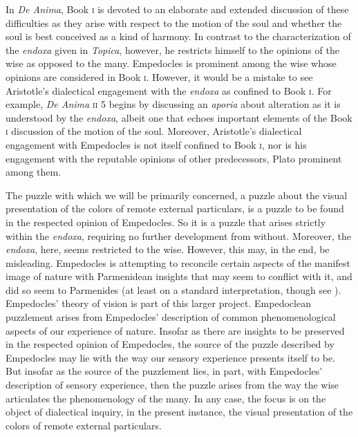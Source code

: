 In \emph{De Anima}, Book \textsc{i} is devoted to an elaborate and extended discussion of these difficulties as they arise with respect to the motion of the soul and whether the soul is best conceived as a kind of harmony. In contrast to the characterization of the \emph{endoxa} given in \emph{Topica}, however, he restricts himself to the opinions of the wise as opposed to the many. Empedocles is prominent among the wise whose opinions are considered in Book \textsc{i}. However, it would be a mistake to see Aristotle's dialectical engagement with the \emph{endoxa} as confined to Book \textsc{i}. For example, \emph{De Anima} \textsc{ii} 5 begins by discussing an \emph{aporia} about alteration as it is understood by the \emph{endoxa}, albeit one that echoes important elements of the Book \textsc{i} discussion of the motion of the soul. Moreover, Aristotle's dialectical engagement with Empedocles is not itself confined to Book \textsc{i}, nor is his engagement with the reputable opinions of other predecessors, Plato prominent among them. 

The puzzle with which we will be primarily concerned, a puzzle about the visual presentation of the colors of remote external particulars, is a puzzle to be found in the respected opinion of Empedocles. So it is a puzzle that arises strictly within the \emph{endoxa}, requiring no further development from without. Moreover, the \emph{endoxa}, here, seems restricted to the wise. However, this may, in the end, be misleading. Empedocles is attempting to reconcile certain aspects of the manifest image of nature with Parmenidean insights that may seem to conflict with it, and did so seem to Parmenides (at least on a standard interpretation, though see \citealt{Palmer:2009qf}). Empedocles' theory of vision is part of this larger project. Empedoclean puzzlement arises from Empedocles' description of common phenomenological aspects of our experience of nature. Insofar as there are insights to be preserved in the respected opinion of Empedocles, the source of the puzzle described by Empedocles may lie with the way our sensory experience presents itself to be. But insofar as the source of the puzzlement lies, in part, with Empedocles' description of sensory experience, then the puzzle arises from the way the wise articulates the phenomenology of the many. In any case, the focus is on the object of dialectical inquiry, in the present instance, the visual presentation of the colors of remote external particulars.


